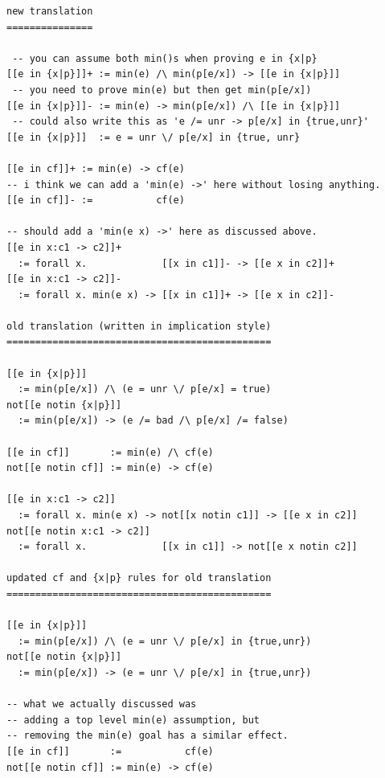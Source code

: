 \documentclass[preprint]{sigplanconf}
\begin{document}
\small
\begin{verbatim}
new translation
===============

 -- you can assume both min()s when proving e in {x|p} 
[[e in {x|p}]]+ := min(e) /\ min(p[e/x]) -> [[e in {x|p}]]
 -- you need to prove min(e) but then get min(p[e/x])
[[e in {x|p}]]- := min(e) -> min(p[e/x]) /\ [[e in {x|p}]]
 -- could also write this as 'e /= unr -> p[e/x] in {true,unr}'
[[e in {x|p}]]  := e = unr \/ p[e/x] in {true, unr}

[[e in cf]]+ := min(e) -> cf(e)
-- i think we can add a 'min(e) ->' here without losing anything.
[[e in cf]]- :=           cf(e)

-- should add a 'min(e x) ->' here as discussed above.
[[e in x:c1 -> c2]]+
  := forall x.             [[x in c1]]- -> [[e x in c2]]+   
[[e in x:c1 -> c2]]-
  := forall x. min(e x) -> [[x in c1]]+ -> [[e x in c2]]-

old translation (written in implication style)
==============================================

[[e in {x|p}]]       
  := min(p[e/x]) /\ (e = unr \/ p[e/x] = true)
not[[e notin {x|p}]] 
  := min(p[e/x]) -> (e /= bad /\ p[e/x] /= false)

[[e in cf]]       := min(e) /\ cf(e)
not[[e notin cf]] := min(e) -> cf(e)

[[e in x:c1 -> c2]] 
  := forall x. min(e x) -> not[[x notin c1]] -> [[e x in c2]]
not[[e notin x:c1 -> c2]]
  := forall x.             [[x in c1]] -> not[[e x notin c2]]

updated cf and {x|p} rules for old translation
==============================================

[[e in {x|p}]]       
  := min(p[e/x]) /\ (e = unr \/ p[e/x] in {true,unr})
not[[e notin {x|p}]] 
  := min(p[e/x]) -> (e = unr \/ p[e/x] in {true,unr})

-- what we actually discussed was 
-- adding a top level min(e) assumption, but
-- removing the min(e) goal has a similar effect.
[[e in cf]]       :=           cf(e)
not[[e notin cf]] := min(e) -> cf(e)
\end{verbatim}
\end{document}
